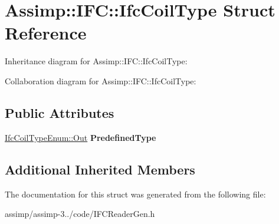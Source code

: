 \hypertarget{struct_assimp_1_1_i_f_c_1_1_ifc_coil_type}{\section{Assimp\+:\+:I\+F\+C\+:\+:Ifc\+Coil\+Type Struct Reference}
\label{struct_assimp_1_1_i_f_c_1_1_ifc_coil_type}
}


Inheritance diagram for Assimp\+:\+:I\+F\+C\+:\+:Ifc\+Coil\+Type\+:


Collaboration diagram for Assimp\+:\+:I\+F\+C\+:\+:Ifc\+Coil\+Type\+:
\subsection*{Public Attributes}
\begin{DoxyCompactItemize}
\item 
\hypertarget{struct_assimp_1_1_i_f_c_1_1_ifc_coil_type_a3a40532d0e4aa46ddf08a39e842a8162}{\hyperlink{classboost_1_1shared__ptr}{Ifc\+Coil\+Type\+Enum\+::\+Out} {\bfseries Predefined\+Type}}\label{struct_assimp_1_1_i_f_c_1_1_ifc_coil_type_a3a40532d0e4aa46ddf08a39e842a8162}

\end{DoxyCompactItemize}
\subsection*{Additional Inherited Members}


The documentation for this struct was generated from the following file\+:\begin{DoxyCompactItemize}
\item 
assimp/assimp-\/3../code/I\+F\+C\+Reader\+Gen.\+h\end{DoxyCompactItemize}

